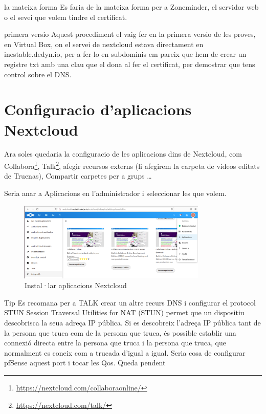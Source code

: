 \documentclass[
  10pt,
]{krantz}
\DeclareRobustCommand{\href}[2]{#2\footnote{\url{#1}}}
\begin{document}
\begin{rmdtip}{la mateixa forma}
Es faria de la mateixa forma per a Zoneminder, el servidor web o el sevei que volem tindre el certificat.

\end{rmdtip}

\begin{rmdinfo}{primera versio}
Aquest procediment el vaig fer en la primera versio de les proves, en Virtual Box, on el servei de nextcloud estava directament en inestable.dedyn.io, per a fer-lo en subdominis em pareix que hem de crear un registre txt amb una clau que el dona al fer el certificat, per demostrar que tens control sobre el DNS.

\end{rmdinfo}

\hypertarget{configuracio-daplicacions-nextcloud}{%
\section{Configuracio d'aplicacions Nextcloud}\label{configuracio-daplicacions-nextcloud}}

Ara soles quedaria la configuracio de les aplicacions dins de Nextcloud, com \href{https://nextcloud.com/collaboraonline/}{Collabora}, \href{https://nextcloud.com/talk/}{Talk}, afegir recursos externs (li afegirem la carpeta de videos editats de Truenas), Compartir carpetes per a grups \ldots{}

Seria anar a Aplicacions en l'administrador i seleccionar les que volem.

\begin{figure}
\centering
\includegraphics[width=0.8\textwidth,height=\textheight]{imatges/proxmox/next_aplica.png}
\caption{Instal·lar aplicacions Nextcloud}
\end{figure}

\begin{rmdtip}{Tip}
Es recomana per a TALK crear un altre recurs DNS i configurar el protocol STUN Session Traversal Utilities for NAT (STUN) permet que un dispositiu descobrisca la seua adreça IP pública. Si es descobreix l'adreça IP pública tant de la persona que truca com de la persona que truca, és possible establir una connexió directa entre la persona que truca i la persona que truca, que normalment es coneix com a trucada d'igual a igual. Seria cosa de configurar pfSense aquest port i tocar les Qos. Queda pendent

\end{rmdtip}
\end{document}
